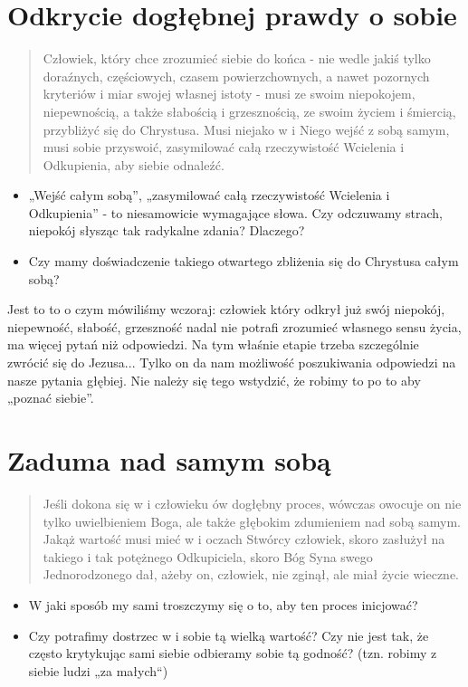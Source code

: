 \documentclass[a5paper,10pt,polish]{book}
\begin{document}
\section{Odkrycie  dogłębnej prawdy  o sobie}
\label{babice2006-wiosna-knurow/spotkanie2:odkrycie-doglebnej-prawdy-o-sobie}\begin{quote}

Człowiek, który chce zrozumieć siebie do końca - nie wedle jakiś tylko doraźnych, częściowych, czasem powierzchownych,  a nawet pozornych kryteriów i miar swojej własnej istoty - musi ze swoim niepokojem, niepewnością, a także słabością i grzesznością, ze swoim życiem i śmiercią, przybliżyć się do Chrystusa. Musi niejako w i Niego wejść z sobą samym,  musi sobie przyswoić, zasymilować całą rzeczywistość Wcielenia i Odkupienia,  aby siebie odnaleźć.
\end{quote}
\begin{itemize}
\item {} 
„Wejść całym sobą”, „zasymilować całą rzeczywistość Wcielenia i Odkupienia” - to niesamowicie wymagające słowa. Czy odczuwamy strach, niepokój słysząc tak radykalne zdania? Dlaczego?

\item {} 
Czy mamy doświadczenie takiego otwartego  zbliżenia się do Chrystusa całym sobą?

\end{itemize}

Jest to to o czym mówiliśmy wczoraj: człowiek który odkrył już swój niepokój, niepewność, słabość, grzeszność nadal nie potrafi zrozumieć własnego sensu życia, ma więcej pytań niż odpowiedzi. Na tym właśnie etapie trzeba szczególnie zwrócić się do Jezusa... Tylko on da nam możliwość poszukiwania odpowiedzi na nasze pytania głębiej.  Nie  należy się tego wstydzić,  że robimy to po to aby „poznać siebie”.


\section{Zaduma  nad samym sobą}
\label{babice2006-wiosna-knurow/spotkanie2:zaduma-nad-samym-soba}\begin{quote}

Jeśli  dokona się w i człowieku ów dogłębny  proces, wówczas owocuje on nie tylko uwielbieniem Boga, ale także głębokim zdumieniem nad sobą samym. Jakąż wartość musi mieć w i oczach Stwórcy człowiek, skoro zasłużył na takiego i tak potężnego Odkupiciela, skoro Bóg Syna swego Jednorodzonego   dał, ażeby on, człowiek, nie zginął, ale miał życie wieczne.
\end{quote}
\begin{itemize}
\item {} 
W jaki sposób my sami troszczymy się o to, aby ten proces inicjować?

\item {} 
Czy potrafimy dostrzec w i sobie tą wielką wartość? Czy nie jest tak, że często krytykując sami siebie odbieramy sobie tą godność? (tzn. robimy z siebie ludzi „za małych“)

\end{itemize}
\end{document}

